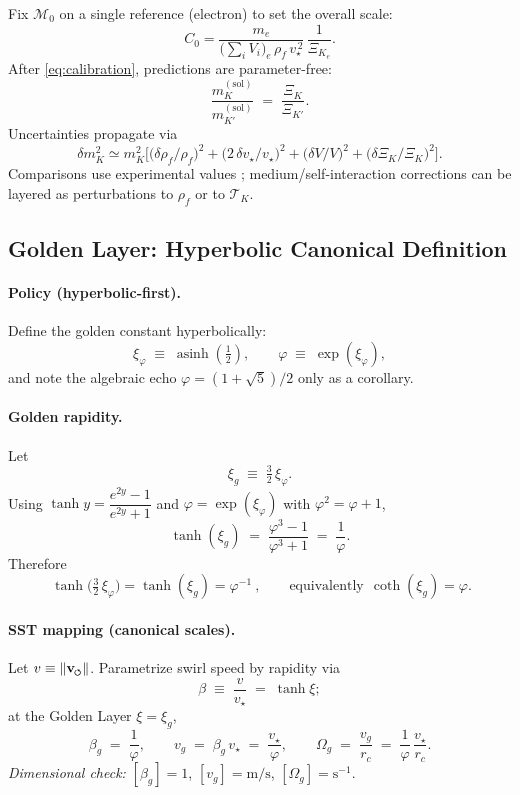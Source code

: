 \documentclass[smallextended]{svjour3}       %
\newcommand{\swirlarrow}{%
	\mathchoice{\mkern-2mu\scriptstyle\boldsymbol{\circlearrowleft}}%
	{\mkern-2mu\scriptstyle\boldsymbol{\circlearrowleft}}%
	{\mkern-2mu\scriptscriptstyle\boldsymbol{\circlearrowleft}}%
	{\mkern-2mu\scriptscriptstyle\boldsymbol{\circlearrowleft}}%
}
\newcommand{\vswirl}{\mathbf{v}_{\swirlarrow}}
\providecommand{\rc}{r_c}
\newcommand{\rhoF}{\rho_{\!f}}      %
\newcommand{\vstar}{v_\star}                           %
\begin{document}
	Fix \(\mathcal{M}_0\) on a single reference (electron) to set the overall scale:
	\begin{equation}
		C_0
		= \frac{m_e}{\big(\sum_i V_i\big)_e \,\rhoF \,\vstar^{\,2}}\,
		\frac{1}{\Xi_{K_e}} .
		\label{eq:calibration}
	\end{equation}
	After \eqref{eq:calibration}, predictions are parameter-free:
	\[
		\frac{m_K^{(\mathrm{sol})}}{m_{K'}^{(\mathrm{sol})}}
		\;=\; \frac{\Xi_K}{\Xi_{K'}}.
	\]
	Uncertainties propagate via
	\begin{equation}
		\delta m_K^2 \simeq m_K^2\Big[
			\big(\delta\rhoF/\rhoF\big)^2
			+ \big(2\,\delta\vstar/\vstar\big)^2
			+ \big(\delta V/V\big)^2
			+ \big(\delta\Xi_K/\Xi_K\big)^2
			\Big].
	\end{equation}
	Comparisons use experimental values \cite{PDG2024}; medium/self-interaction corrections can be layered as perturbations to \(\rhoF\) or to \(\mathcal{T}_K\).

	\subsection{Golden Layer: Hyperbolic Canonical Definition}
	\label{sec:golden_layer}

	\paragraph*{Policy (hyperbolic-first).}
	Define the golden constant hyperbolically:
	\[
		\xi_\varphi \;\equiv\; \operatorname{asinh}\!\left(\tfrac{1}{2}\right),
		\qquad
		\varphi \;\equiv\; \exp(\xi_\varphi),
	\]
	and note the algebraic echo \(\varphi=(1+\sqrt5)/2\) only as a corollary.

	\paragraph*{Golden rapidity.}
	Let
	\[
		\xi_g \;\equiv\; \tfrac{3}{2}\,\xi_\varphi.
	\]
	Using \(\tanh y=\dfrac{e^{2y}-1}{e^{2y}+1}\) \cite{NISTDLMF} and \(\varphi=\exp(\xi_\varphi)\) with \(\varphi^2=\varphi+1\),
	\[
		\tanh(\xi_g) \;=\; \frac{\varphi^3-1}{\varphi^3+1}
		\;=\; \frac{1}{\varphi}.
	\]
	Therefore
	\[
		\boxed{\ \tanh\!\big(\tfrac{3}{2}\,\xi_\varphi\big)=\tanh(\xi_g)=\varphi^{-1}\ },
		\qquad\text{equivalently}\ \ \coth(\xi_g)=\varphi.
	\]

	\paragraph*{SST mapping (canonical scales).}
	Let \(v\equiv\|\vswirl\|\). Parametrize swirl speed by rapidity via
	\[
		\beta \;\equiv\; \frac{v}{\vstar} \;=\; \tanh\xi;
	\]
	at the Golden Layer \(\xi=\xi_g\),
	\[
		\beta_g \;=\; \frac{1}{\varphi},\qquad
		v_g \;=\; \beta_g\,\vstar \;=\; \frac{\vstar}{\varphi},\qquad
		\Omega_g \;=\; \frac{v_g}{\rc} \;=\; \frac{1}{\varphi}\,\frac{\vstar}{\rc}.
	\]
	\emph{Dimensional check:} \([\beta_g]=1\), \([v_g]=\mathrm{m/s}\), \([\Omega_g]=\mathrm{s}^{-1}\).
\end{document}
